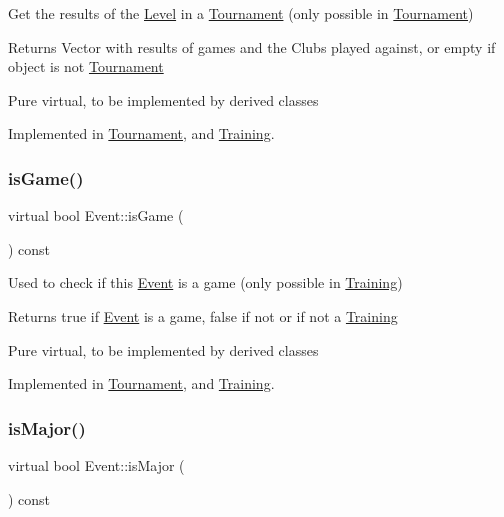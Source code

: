 Get the results of the \hyperlink{class_level}{Level} in a \hyperlink{class_tournament}{Tournament} (only possible in \hyperlink{class_tournament}{Tournament}) 

\begin{DoxyReturn}{Returns}
Vector with results of games and the Clubs played against, or empty if object is not \hyperlink{class_tournament}{Tournament}
\end{DoxyReturn}
Pure virtual, to be implemented by derived classes 

Implemented in \hyperlink{class_tournament_abacd2d5489099f31a9688a7da4d64c40}{Tournament}, and \hyperlink{class_training_aa37e2baeee2b94cb15521e1768b99cc9}{Training}.

\hypertarget{class_event_add36e9739215f6744040c11de50b26b7}{}\label{class_event_add36e9739215f6744040c11de50b26b7} 
\subsubsection{\texorpdfstring{is\+Game()}{isGame()}}
{\footnotesize\ttfamily virtual bool Event\+::is\+Game (\begin{DoxyParamCaption}{ }\end{DoxyParamCaption}) const\hspace{0.3cm}{\ttfamily [pure virtual]}}



Used to check if this \hyperlink{class_event}{Event} is a game (only possible in \hyperlink{class_training}{Training}) 

\begin{DoxyReturn}{Returns}
true if \hyperlink{class_event}{Event} is a game, false if not or if not a \hyperlink{class_training}{Training}
\end{DoxyReturn}
Pure virtual, to be implemented by derived classes 

Implemented in \hyperlink{class_tournament_a62adb322a6d5268d4ec3e267570ff4ed}{Tournament}, and \hyperlink{class_training_a55530cc22aa771cf3e452c7158b5396e}{Training}.

\hypertarget{class_event_ad1a1a9cb471d664a2ca99effc102259b}{}\label{class_event_ad1a1a9cb471d664a2ca99effc102259b} 
\subsubsection{\texorpdfstring{is\+Major()}{isMajor()}}
{\footnotesize\ttfamily virtual bool Event\+::is\+Major (\begin{DoxyParamCaption}{ }\end{DoxyParamCaption}) const\hspace{0.3cm}{\ttfamily [pure virtual]}}



